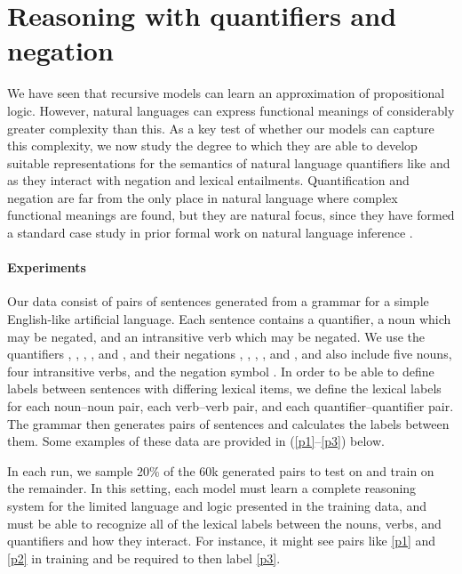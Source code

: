 \section{Reasoning with quantifiers and negation}\label{sec:quantifiers}

We have seen that recursive models can learn an approximation of propositional
logic.  However, natural languages can express functional meanings of
considerably greater complexity than this.  As a key test of whether our models 
can capture this complexity, we now study the degree to which they are able to
develop suitable representations for the semantics of natural language
quantifiers like  and  as they interact with negation and lexical entailments. Quantification 
and negation are far from the only place in natural language where complex functional meanings
are found, but they are natural focus, since they have
formed a standard case study in prior formal work on natural
language inference \cite{Icard:Moss:2013:LILT}.

\paragraph{Experiments}
Our data consist of pairs of sentences generated
from a grammar for a simple English-like artificial language.
Each sentence contains a quantifier, a noun
which may be negated, and an intransitive verb which may be
negated. We use the quantifiers , , ,
, and , and their negations , ,
, , and , and also
include five nouns, four intransitive verbs, and the negation symbol
. In order to be able to define labels between sentences
with differing lexical items, we define the lexical labels for
each noun--noun pair, each verb--verb pair, and each
quantifier--quantifier pair. The grammar then generates pairs of
sentences and calculates the labels
between them.  
Some examples of these data are provided in (\ref{p1}--\ref{p3}) below.


















In each run, we sample 20\% of the 60k generated pairs to test on and 
train on the remainder. In this setting, each model must learn a
complete reasoning system for the limited language and logic presented
in the training data, and must be able
to recognize all of the lexical labels between the nouns, verbs,
and quantifiers and how they interact. For instance, it might see
pairs like \eqref{p1} and \eqref{p2} in training and be required to 
then label \eqref{p3}.

